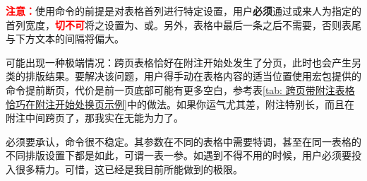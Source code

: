 \documentclass[doctor, vlined, ]{DissertUESTC}
\begin{document}
	\textcolor{red}{\textbf{注意：}}使用命令的前提是对表格首列进行特定设置，用户\textbf{必须}通过或来人为指定的首列宽度，\textcolor{red}{\textbf{切不可}}将之设置为、或。另外，表格中最后一条之后不需要\shadcmd{\shadcmd{}}，否则表尾与下方文本的间隔将偏大。

	可能出现一种极端情况：跨页表格恰好在附注开始处发生了分页，此时也会产生另类的排版结果。要解决该问题，用户得手动在表格内容的适当位置使用\href{https://mirrors.tuna.tsinghua.edu.cn/CTAN/macros/latex/required/tools/longtable.pdf}{\ttfamily\color{DarkRed}}宏包提供的命令提前断页，代价是前一页底部可能有更多空白，参考表\ref{tab: 跨页带附注表格恰巧在附注开始处换页示例}中的做法。如果你运气尤其差，附注特别长，而且在附注中间跨页了，那我实在无能为力了。

	必须要承认，命令很不稳定。其参数在不同的表格中需要特调，甚至在同一表格的不同排版设置下都是如此，可谓一表一参。如遇到不得不用的时候，用户必须要投入很多精力。可惜，这已经是我目前所能做到的极限。


	\newpage
\end{document}
